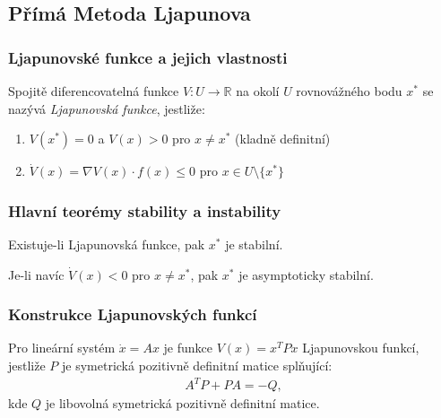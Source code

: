 \subsection{Přímá Metoda Ljapunova}

\subsubsection{Ljapunovské funkce a jejich vlastnosti}

\begin{definition}
Spojitě diferencovatelná funkce $V: U \to \mathbb{R}$ na okolí $U$ rovnovážného bodu $x^*$ se nazývá \emph{Ljapunovská funkce}, jestliže:
\begin{enumerate}
\item $V(x^*) = 0$ a $V(x) > 0$ pro $x \neq x^*$ (kladně definitní)
\item $\dot{V}(x) = \nabla V(x) \cdot f(x) \leq 0$ pro $x \in U \setminus \{x^*\}$
\end{enumerate}
\end{definition}

\subsubsection{Hlavní teorémy stability a instability}

\begin{theorem}
Existuje-li Ljapunovská funkce, pak $x^*$ je stabilní.
\end{theorem}

\begin{theorem}
Je-li navíc $\dot{V}(x) < 0$ pro $x \neq x^*$, pak $x^*$ je asymptoticky stabilní.
\end{theorem}

\subsubsection{Konstrukce Ljapunovských funkcí}

\begin{theorem}
Pro lineární systém $\dot{x} = Ax$ je funkce $V(x) = x^T P x$ Ljapunovskou funkcí, jestliže $P$ je symetrická pozitivně definitní matice splňující:
\begin{align*}
A^T P + P A = -Q,
\end{align*}
kde $Q$ je libovolná symetrická pozitivně definitní matice.
\end{theorem}

